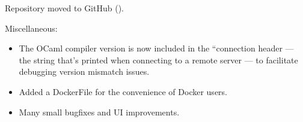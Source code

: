 \begin{changesfromversion}{2.48}
\item Repository moved to GitHub ().
\item Miscellaneous:
\begin{itemize}
\item The OCaml compiler version is now included in the ``connection header
--- the string that's printed when connecting to a remote server --- to
facilitate debugging version mismatch issues.  
\item Added a DockerFile for the convenience of Docker users.
\item Many small bugfixes and UI improvements.
\end{itemize}
\end{changesfromversion}

